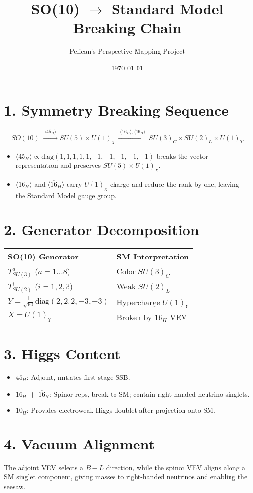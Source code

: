\documentclass[12pt]{article}
\title{SO(10) $\rightarrow$ Standard Model Breaking Chain}
\author{Pelican's Perspective Mapping Project}
\date{\today}
\begin{document}
\maketitle

\section*{1. Symmetry Breaking Sequence}
\[
SO(10) 
\;\xrightarrow{\;\langle 45_H\rangle\;} 
SU(5)\times U(1)_\chi 
\;\xrightarrow{\;\langle 16_H\rangle,\langle\overline{16}_H\rangle\;} 
SU(3)_C\times SU(2)_L\times U(1)_Y
\]

\begin{itemize}
  \item $\langle 45_H\rangle \propto \mathrm{diag}(1,1,1,1,1,-1,-1,-1,-1,-1)$ breaks the vector representation and preserves $SU(5)\times U(1)_\chi$.
  \item $\langle 16_H\rangle$ and $\langle \overline{16}_H\rangle$ carry $U(1)_\chi$ charge and reduce the rank by one, leaving the Standard Model gauge group.
\end{itemize}

\section*{2. Generator Decomposition}
\begin{center}
\begin{tabular}{ll}
\toprule
SO(10) Generator & SM Interpretation \\
\midrule
$T^{a}_{SU(3)}$ ($a=1\ldots 8$) & Color $SU(3)_C$ \\
$T^{i}_{SU(2)}$ ($i=1,2,3$) & Weak $SU(2)_L$ \\
$Y = \frac{1}{\sqrt{60}}\mathrm{diag}(2,2,2,-3,-3)$ & Hypercharge $U(1)_Y$ \\
$X = U(1)_\chi$ & Broken by $16_H$ VEV \\
\bottomrule
\end{tabular}
\end{center}

\section*{3. Higgs Content}
\begin{itemize}
  \item \textbf{$45_H$}: Adjoint, initiates first stage SSB.
  \item \textbf{$16_H$ + $\overline{16}_H$}: Spinor reps, break to SM; contain right-handed neutrino singlets.
  \item \textbf{$10_H$}: Provides electroweak Higgs doublet after projection onto SM.
\end{itemize}

\section*{4. Vacuum Alignment}
The adjoint VEV selects a $B-L$ direction, while the spinor VEV aligns along a SM singlet component, giving masses to right-handed neutrinos and enabling the seesaw.
\end{document}
